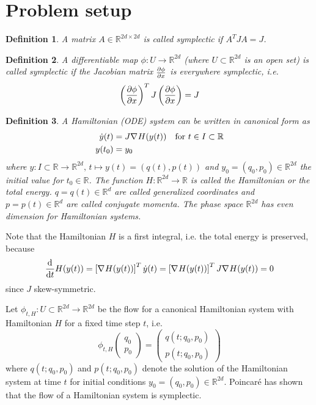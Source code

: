 \documentclass[twoside,a4paper]{article}
\newtheorem{definition}{Definition}
\begin{document}
\section{Problem setup}

\begin{definition}
	A matrix $A \in \mathbb{R}^{2d \times 2d}$ is called symplectic if $A^TJA=J$.
\end{definition}

\begin{definition}
	A differentiable map $\phi : U \to \mathbb{R}^{2d}$ (where $U \subset \mathbb{R}^{2d}$ is an open set)
	is called symplectic if the Jacobian matrix $\frac{\partial \phi}{\partial x}$ is everywhere symplectic, i.e.
	\begin{equation*}
		\left( \frac{\partial \phi}{\partial x} \right)^T J \left( \frac{\partial \phi}{\partial x} \right) = J
	\end{equation*}
\end{definition}

\begin{definition}
	A Hamiltonian (ODE) system can be written in canonical form as
	\begin{align*}
		\dot{y}(t) &= J \nabla_{}{H}(y(t)) \quad \text{for } t \in I \subset \mathbb{R} \\
		y(t_0) &= y_0
	\end{align*}
	where $y: I \subset \mathbb{R} \to \mathbb{R}^{2d},\, t \mapsto y(t) = (q(t),p(t))$ and 
	$y_0 = (q_0, p_0) \in \mathbb{R}^{2d}$ the initial value for $t_0 \in \mathbb{R}$. 
	The function $H: \mathbb{R}^{2d} \to \mathbb{R}$ is called the Hamiltonian 
	or the total energy. $q = q(t) \in \mathbb{R}^d$ are called generalized coordinates
	and $p=p(t) \in \mathbb{R}^d$ are called conjugate momenta. 
	The phase space $\mathbb{R}^{2d}$ has even dimension for Hamiltonian systems.
\end{definition}

Note that the Hamiltonian $H$ is a first integral, i.e. the total energy is preserved, because
\begin{equation*}
	\frac{\mathrm{d}^{}}{\mathrm{d}t} H(y(t)) = \left[ \nabla_{}{H}(y(t)) \right]^T \dot{y}(t) = 
	\left[ \nabla_{}{H}(y(t)) \right]^T J \nabla_{}{H}(y(t)) = 0
\end{equation*}
since $J$ skew-symmetric.

Let $\phi_{t,H} : U \subset \mathbb{R}^{2d} \to \mathbb{R}^{2d}$ be the flow for a 
canonical Hamiltonian system with Hamiltonian $H$ for a fixed time step $t$, i.e.
\begin{equation*}
	\phi_{t,H}\begin{pmatrix}
		q_0 \\
		p_0
	\end{pmatrix}
	= \begin{pmatrix}
		q(t; q_0, p_0) \\
		p(t; q_0, p_0)
	\end{pmatrix}
\end{equation*}
where $q(t; q_0, p_0)$ and $p(t; q_0, p_0)$ denote the solution of the Hamiltonian system
at time $t$ for initial conditions $y_0 = (q_0,p_0) \in \mathbb{R}^{2d}$. 
Poincaré has shown that the flow of a Hamiltonian system is symplectic.
\end{document}
